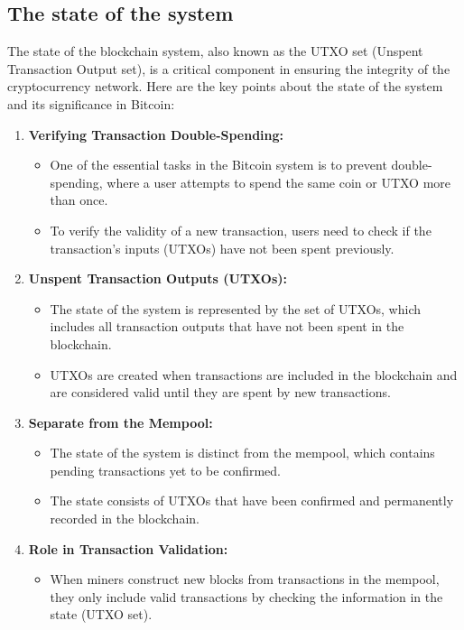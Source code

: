 \subsection{The state of the system}
The state of the blockchain system, also known as the UTXO set (Unspent Transaction Output set), is a critical component in ensuring the integrity of the cryptocurrency network. Here are the key points about the state of the system and its significance in Bitcoin:
\begin{enumerate}
    \item \textbf{Verifying Transaction Double-Spending:}
    \begin{itemize}
        \item One of the essential tasks in the Bitcoin system is to prevent double-spending, where a user attempts to spend the same coin or UTXO more than once.
        \item To verify the validity of a new transaction, users need to check if the transaction's inputs (UTXOs) have not been spent previously.
    \end{itemize}
    \item \textbf{Unspent Transaction Outputs (UTXOs):}
    \begin{itemize}
        \item The state of the system is represented by the set of UTXOs, which includes all transaction outputs that have not been spent in the blockchain.
        \item UTXOs are created when transactions are included in the blockchain and are considered valid until they are spent by new transactions.
    \end{itemize}
    \item \textbf{Separate from the Mempool:}
    \begin{itemize}
        \item The state of the system is distinct from the mempool, which contains pending transactions yet to be confirmed.
        \item The state consists of UTXOs that have been confirmed and permanently recorded in the blockchain.
    \end{itemize}
    \item \textbf{Role in Transaction Validation:}
    \begin{itemize}
        \item When miners construct new blocks from transactions in the mempool, they only include valid transactions by checking the information in the state (UTXO set).

\end{itemize}
\end{enumerate}
